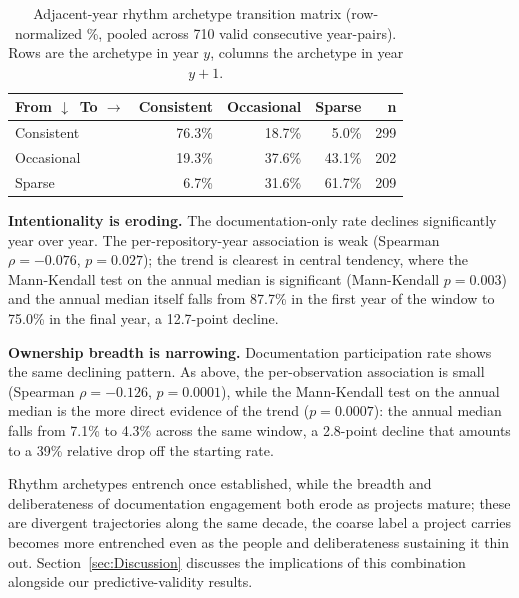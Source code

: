 \documentclass[10pt,conference]{IEEEtran}
\begin{document}
{{\vspace{-6pt}
\begin{table}[h]
\centering
\small
\caption{Adjacent-year rhythm archetype transition matrix (row-normalized \%, pooled across 710 valid consecutive year-pairs). Rows are the archetype in year $y$, columns the archetype in year $y{+}1$.}
\label{tab:transition_matrix}
\setlength{\tabcolsep}{4pt}
\renewcommand{\arraystretch}{1.2}
\begin{tabular}{lrrrr}
\toprule
\textbf{From $\downarrow$\, To $\rightarrow$} & \textbf{Consistent} & \textbf{Occasional} & \textbf{Sparse} & \textbf{n} \\
\midrule
Consistent & 76.3\% & 18.7\% & 5.0\%  & 299 \\
Occasional & 19.3\% & 37.6\% & 43.1\% & 202 \\
Sparse     & 6.7\%  & 31.6\% & 61.7\% & 209 \\
\bottomrule
\end{tabular}
\end{table}
\vspace{-6pt}

\textbf{Intentionality is eroding.} The documentation-only rate declines significantly year over year. The per-repository-year association is weak (Spearman $\rho = -0.076$, $p = 0.027$); the trend is clearest in central tendency, where the Mann-Kendall test on the annual median is significant (Mann-Kendall $p = 0.003$) and the annual median itself falls from 87.7\% in the first year of the window to 75.0\% in the final year, a 12.7-point decline.

\textbf{Ownership breadth is narrowing.} Documentation participation rate shows the same declining pattern. As above, the per-observation association is small (Spearman $\rho = -0.126$, $p = 0.0001$), while the Mann-Kendall test on the annual median is the more direct evidence of the trend ($p = 0.0007$): the annual median falls from 7.1\% to 4.3\% across the same window, a 2.8-point decline that amounts to a 39\% relative drop off the starting rate.

Rhythm archetypes entrench once established, while the breadth and deliberateness of documentation engagement both erode as projects mature; these are divergent trajectories along the same decade, the coarse label a project carries becomes more entrenched even as the people and deliberateness sustaining it thin out. Section~\ref{sec:Discussion} discusses the implications of this combination alongside our predictive-validity results.

}}
\end{document}
